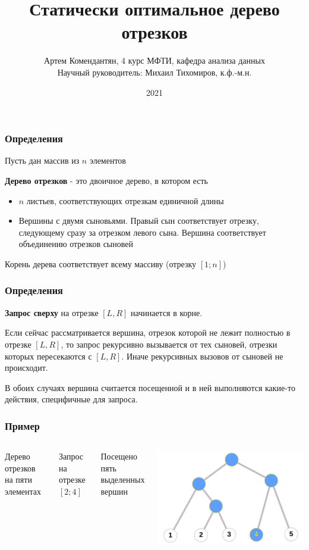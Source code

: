 \documentclass{beamer}
\title{Статически оптимальное дерево отрезков}
\author{Артем Комендантян, 4 курс МФТИ, кафедра анализа данных \\
\small{Научный руководитель: Михаил Тихомиров, к.ф.-м.н.}
}
\date{2021}
\begin{document}
\frame{\titlepage}

\begin{frame}
\frametitle{Определения}
Пусть дан массив из $n$ элементов

\textbf{Дерево отрезков} - это двоичное дерево, в котором есть

\begin{itemize}
\item $n$ листьев, соответствующих отрезкам единичной длины
\item Вершины с двумя сыновьями. Правый сын соответствует отрезку, следующему сразу за отрезком левого сына. Вершина соответствует объединению отрезков сыновей
\end{itemize}
Корень дерева соответствует всему массиву (отрезку $[1; n]$)

\end{frame}

\begin{frame}
\frametitle{Определения}

\textbf{Запрос сверху} на отрезке $[L, R]$ начинается в корне.

Если сейчас рассматривается вершина, отрезок которой не лежит полностью в отрезке $[L, R]$, то запрос рекурсивно вызывается от тех сыновей, отрезки которых пересекаются с $[L, R]$. Иначе рекурсивных вызовов от сыновей не происходит.

В обоих случаях вершина считается посещенной и в ней выполняются какие-то действия, специфичные для запроса.

\end{frame}

\begin{frame}
\frametitle{Пример}

\begin{columns}
Дерево отрезков на пяти элементах

Запрос на отрезке $[2; 4]$

Посещено пять выделенных вершин

\includegraphics[scale=0.22]{segtree_example.png}
\end{columns}

\end{frame}
\end{document}
